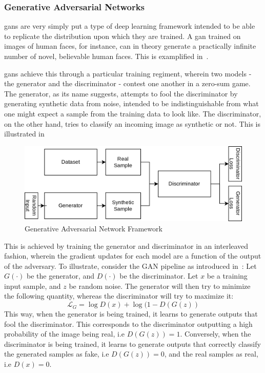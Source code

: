     \subsubsection{Generative Adversarial Networks}
     \glspl{gan} are very simply put a type of deep learning framework intended to be able to replicate the distribution upon which they are trained. A \gls{gan} trained on images of human faces, for instance, can in theory generate a practically infinite number of novel, believable human faces. This is examplified in~\cite{facegan}. 
     
     \glspl{gan} achieve this through a particular training regiment, wherein two models - the generator and the discriminator - contest one another in a zero-sum game. The generator, as its name suggests, attempts to fool the discriminator by generating synthetic data from noise, intended to be indistinguishable from what one might expect a sample from the training data to look like. The discriminator, on the other hand, tries to classify an incoming image as synthetic or not. This is illustrated in~ 
     \begin{figure}
         \centering
         \includegraphics[width=\linewidth]{illustrations/gan.png}
         \caption{Generative Adversarial Network Framework}
         \label{fig:gan}
     \end{figure}
     
     This is achieved by training the generator and discriminator in an interleaved fashion, wherein the gradient updates for each model are a function of the output of the adversary. To illustrate, consider the GAN pipeline as introduced in~\cite{gan_first}:
     Let \(G(\cdot)\) be the generator, and \(D(\cdot)\) be the discriminator. Let \(x\) be a training input sample, and \(z\) be random noise. The generator will then try to minimize the following quantity, whereas the discriminator will try to maximize it:
     \begin{equation}\label{gan_loss}
        \mathcal{L}_G = \log{D(x)} + \log{(1-D(G(z))} 
     \end{equation}
     This way, when the generator is being trained, it learns to generate outputs that fool the discriminator. This corresponds to the discriminator outputting a high probability of the image being real, i.e \(D(G(z)) = 1\). Conversely, when the discriminator is being trained, it learns to generate outputs that correctly classify the generated samples as fake, i.e \(D(G(z)) = 0\), and the real samples as real, i.e \(D(x) = 0\). 
     
